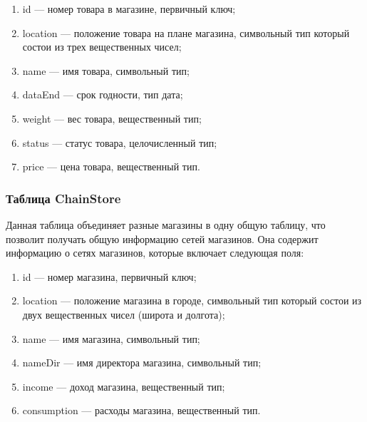 \begin{enumerate}[label=\arabic*.]
    \item id --- номер товара в магазине, первичный ключ;
    \item location --- положение товара на плане магазина, символьный тип 
    который состои из трех вещественных чисел;
    \item name --- имя товара, символьный тип;
    \item dataEnd --- срок годности, тип дата;
    \item weight --- вес товара, вещественный тип;
    \item status --- статус товара, целочисленный тип;
    \item price --- цена товара, вещественный тип.
\end{enumerate}

\subsubsection{Таблица ChainStore}

Данная таблица объединяет разные магазины в одну общую таблицу, что позволит получать общую информацию сетей магазинов.
Она содержит информацию о сетях магазинов, которые включает следующая поля:

\begin{enumerate}[label=\arabic*.]
    \item id --- номер магазина, первичный ключ;
    \item location --- положение магазина в городе, символьный тип 
    который состои из двух вещественных чисел (широта и долгота);
    \item name --- имя магазина, символьный тип;
    \item nameDir --- имя директора магазина, символьный тип;
    \item income --- доход магазина, вещественный тип;
    \item consumption --- расходы магазина, вещественный тип.
\end{enumerate}



